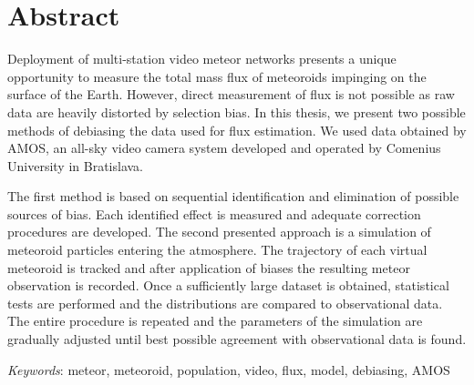 \section*{Abstract}
    Deployment of multi-station video meteor networks presents a unique opportunity
    to measure the total mass flux of meteoroids impinging on the surface of the Earth.
    However, direct measurement of flux is not possible as raw data are heavily distorted by selection bias. 
    In this thesis, we present two possible methods of debiasing the data used for flux estimation.
    We used data obtained by AMOS, an all-sky video camera system developed and operated by Comenius University in Bratislava.
    
    The first method is based on sequential identification and elimination of possible sources of bias.
    Each identified effect is measured and adequate correction procedures are developed.
    The second presented approach is a simulation of meteoroid particles entering the atmosphere.
    The trajectory of each virtual meteoroid is tracked and after application of biases
    the resulting meteor observation is recorded. Once a sufficiently large dataset is obtained,
    statistical tests are performed and the distributions are compared to observational data.
    The entire procedure is repeated and the parameters of the simulation are gradually adjusted
    until best possible agreement with observational data is found.

    \emph{Keywords}: meteor, meteoroid, population, video, flux, model, debiasing, AMOS
